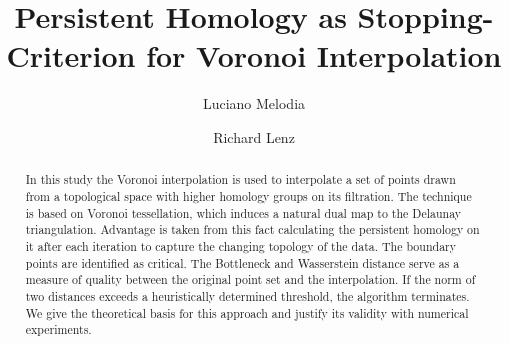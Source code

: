 \documentclass[runningheads]{llncs}
\begin{document}
%
\title{Persistent Homology as Stopping-Criterion for Voronoi Interpolation}
%
%
\author{Luciano Melodia \\ \and
Richard Lenz}
%
%
%
%
\maketitle              %
%
\begin{abstract}
In this study the Voronoi interpolation is used to interpolate a set of points drawn from a topological space with higher homology groups on its filtration. The technique is based on Voronoi tessellation, which induces a natural dual map to the Delaunay triangulation. Advantage is taken from this fact calculating the persistent homology on it after each iteration to capture the changing topology of the data. The boundary points are identified as critical. The Bottleneck and Wasserstein distance serve as a measure of quality between the original point set and the interpolation. If the norm of two distances exceeds a heuristically determined threshold, the algorithm terminates. We give the theoretical basis for this approach and justify its validity with numerical experiments.

\end{abstract}
\end{document}
